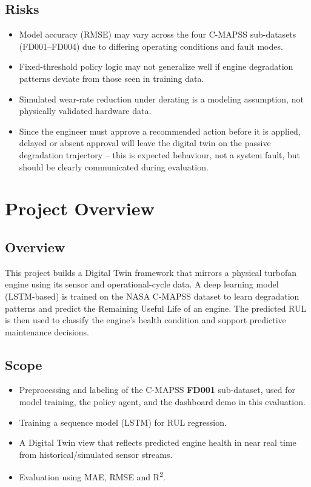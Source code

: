 \documentclass[12pt,a4paper]{report}
\begin{document}
\subsection*{Risks}
\begin{itemize}
    \item Model accuracy (RMSE) may vary across the four C-MAPSS sub-datasets (FD001--FD004) due to differing operating conditions and fault modes.
    \item Fixed-threshold policy logic may not generalize well if engine degradation patterns deviate from those seen in training data.
    \item Simulated wear-rate reduction under derating is a modeling assumption, not physically validated hardware data.
    \item Since the engineer must approve a recommended action before it is applied, delayed or absent approval will leave the digital twin on the passive degradation trajectory -- this is expected behaviour, not a system fault, but should be clearly communicated during evaluation.
\end{itemize}

\section{Project Overview}
 
\subsection*{Overview}
This project builds a Digital Twin framework that mirrors a physical turbofan engine using its sensor and operational-cycle data. A deep learning model (LSTM-based) is trained on the NASA C-MAPSS dataset to learn degradation patterns and predict the Remaining Useful Life of an engine. The predicted RUL is then used to classify the engine's health condition and support predictive maintenance decisions.
 
\subsection*{Scope}
\begin{itemize}
    \item Preprocessing and labeling of the C-MAPSS \textbf{FD001} sub-dataset, used for model training, the policy agent, and the dashboard demo in this evaluation.
    \item Training a sequence model (LSTM) for RUL regression.
    \item A Digital Twin view that reflects predicted engine health in near real time from historical/simulated sensor streams.
    \item Evaluation using MAE, RMSE and R\textsuperscript{2}.
\end{itemize}
 
\end{document}
